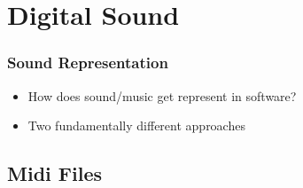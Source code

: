 \section{Digital Sound}

\frame{\tableofcontents[currentsection]}

\begin{frame}
  \frametitle{Sound Representation}
  \begin{itemize}
    \item How does sound/music get represent in software?
    \item Two fundamentally different approaches
  \end{itemize}
\end{frame}


\subsection{Midi Files}

\frame{\tableofcontents[currentsubsection]}



